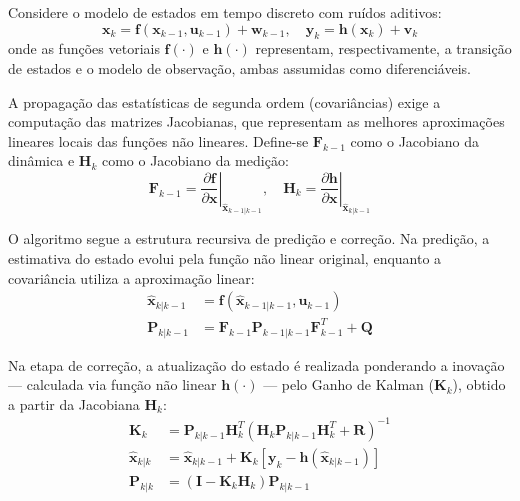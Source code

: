 \documentclass[a4paper,12pt]{article}
\begin{document}
Considere o modelo de estados em tempo discreto com ruídos aditivos:
\begin{equation}
    \mathbf{x}_k = \mathbf{f}(\mathbf{x}_{k-1}, \mathbf{u}_{k-1}) + \mathbf{w}_{k-1}, \quad \mathbf{y}_k = \mathbf{h}(\mathbf{x}_k) + \mathbf{v}_k
\end{equation}
onde as funções vetoriais $\mathbf{f}(\cdot)$ e $\mathbf{h}(\cdot)$ representam, respectivamente, a transição de estados e o modelo de observação, ambas assumidas como diferenciáveis.

A propagação das estatísticas de segunda ordem (covariâncias) exige a computação das matrizes Jacobianas, que representam as melhores aproximações lineares locais das funções não lineares. Define-se $\mathbf{F}_{k-1}$ como o Jacobiano da dinâmica e $\mathbf{H}_k$ como o Jacobiano da medição:
\begin{equation}
    \mathbf{F}_{k-1} = \left. \frac{\partial \mathbf{f}}{\partial \mathbf{x}} \right|_{\hat{\mathbf{x}}_{k-1|k-1}}, \quad \mathbf{H}_k = \left. \frac{\partial \mathbf{h}}{\partial \mathbf{x}} \right|_{\hat{\mathbf{x}}_{k|k-1}}
\end{equation}

O algoritmo segue a estrutura recursiva de predição e correção. Na predição, a estimativa do estado evolui pela função não linear original, enquanto a covariância utiliza a aproximação linear:
\begin{align}
    \hat{\mathbf{x}}_{k|k-1} &= \mathbf{f}(\hat{\mathbf{x}}_{k-1|k-1}, \mathbf{u}_{k-1}) \label{eq:ekf_pred_x} \\
    \mathbf{P}_{k|k-1} &= \mathbf{F}_{k-1} \mathbf{P}_{k-1|k-1} \mathbf{F}_{k-1}^T + \mathbf{Q}
\end{align}

Na etapa de correção, a atualização do estado é realizada ponderando a inovação --- calculada via função não linear $\mathbf{h}(\cdot)$ --- pelo Ganho de Kalman ($\mathbf{K}_k$), obtido a partir da Jacobiana $\mathbf{H}_k$:
\begin{align}
    \mathbf{K}_k &= \mathbf{P}_{k|k-1} \mathbf{H}_k^T (\mathbf{H}_k \mathbf{P}_{k|k-1} \mathbf{H}_k^T + \mathbf{R})^{-1} \\
    \hat{\mathbf{x}}_{k|k} &= \hat{\mathbf{x}}_{k|k-1} + \mathbf{K}_k [ \mathbf{y}_k - \mathbf{h}(\hat{\mathbf{x}}_{k|k-1}) ] \\
    \mathbf{P}_{k|k} &= (\mathbf{I} - \mathbf{K}_k \mathbf{H}_k) \mathbf{P}_{k|k-1}
\end{align}
\end{document}
